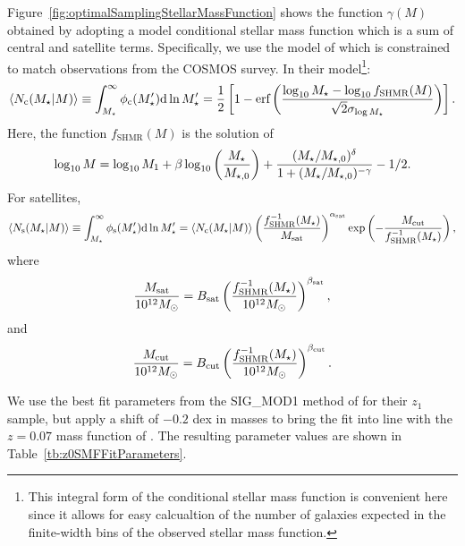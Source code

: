 Figure~\ref{fig:optimalSamplingStellarMassFunction} shows the function $\gamma(M)$ obtained by adopting a model conditional stellar mass function which is a sum of central and satellite terms. Specifically, we use the model of \cite{leauthaud_new_2011} which is constrained to match observations from the COSMOS survey. In their model\footnote{This integral form of the conditional stellar mass function is convenient here since it allows for easy calcualtion of the number of galaxies expected in the finite-width bins of the observed stellar mass function.}:
\begin{equation}
 \langle N_\mathrm{c}(M_\star|M)\rangle \equiv \int_{M_\star}^\infty \phi_\mathrm{c}(M_\star^\prime) \d \ln M_\star^\prime = {1 \over 2} \left[ 1 - \hbox{erf}\left( {\log_{10}M_\star - \log_{10} f_\mathrm{SHMR}(M) \over \sqrt{2}\sigma_{\log M_\star}} \right) \right].
\end{equation}
Here, the function $f_\mathrm{SHMR}(M)$ is the solution of
\begin{equation}
 \log_{10}M = \log_{10}M_1 + \beta \log_{10}\left({M_\star \over M_{\star,0}}\right) + {(M_\star/M_{\star,0})^\delta \over 1 + (M_\star/M_{\star,0})^{-\gamma}} - {1/2}.
\end{equation}
For satellites,
\begin{equation}
 \langle N_\mathrm{s}(M_\star|M)\rangle \equiv \int_{M_\star}^\infty \phi_\mathrm{s}(M_\star^\prime) \d \ln M_\star^\prime =  \langle N_\mathrm{c}(M_\star|M)\rangle \left({f^{-1}_\mathrm{SHMR}(M_\star) \over M_\mathrm{sat}}\right)^{\alpha_\mathrm{sat}} \exp\left(- {M_\mathrm{cut} \over f^{-1}_\mathrm{SHMR}(M_\star)} \right),
\end{equation}
where
\begin{equation}
 {M_\mathrm{sat} \over 10^{12} M_\odot} = B_\mathrm{sat} \left({f^{-1}_\mathrm{SHMR}(M_\star) \over 10^{12} M_\odot}\right)^{\beta_\mathrm{sat}},
\end{equation}
and
\begin{equation}
 {M_\mathrm{cut} \over 10^{12} M_\odot} = B_\mathrm{cut} \left({f^{-1}_\mathrm{SHMR}(M_\star) \over 10^{12} M_\odot}\right)^{\beta_\mathrm{cut}}.
\end{equation}

We use the best fit parameters from the {\normalfont \ttfamily SIG\_MOD1} method of \cite{leauthaud_new_2011} for their $z_1$ sample, but apply a shift of $-0.2$ dex in masses to bring the fit into line with the $z=0.07$ mass function of \cite{li_distribution_2009}. The resulting parameter values are shown in Table~\ref{tb:z0SMFFitParameters}.

